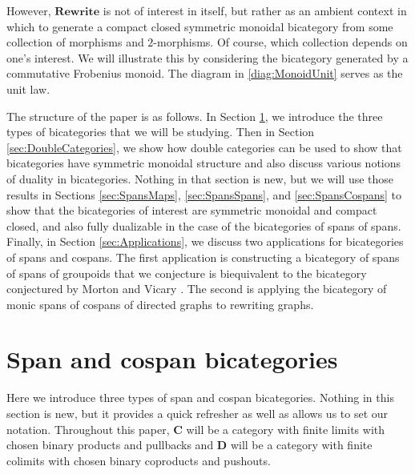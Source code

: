 \documentclass[11pt]{amsart}
\newcommand{\cat}[1]{\mathbf{#1}}
\theoremstyle{remark}
\theoremstyle{definition}
\begin{document}
However, $\cat{Rewrite}$ is not of interest in itself, but rather as an ambient context in which to generate a compact closed symmetric monoidal bicategory from some collection of morphisms and $2$-morphisms. Of course, which collection depends on one's interest.  We will illustrate this by considering the bicategory generated by a commutative Frobenius monoid. The diagram in \eqref{diag:MonoidUnit} serves as the unit law.  
 
The structure of the paper is as follows.  In Section \ref{sec:Span cospan bicats}, we introduce the three types of bicategories that we will be studying.  Then in Section \ref{sec:DoubleCategories}, we show how double categories can be used to show that bicategories have symmetric monoidal structure and also discuss various notions of duality in bicategories.  Nothing in that section is new, but we will use those results in Sections \ref{sec:SpansMaps}, \ref{sec:SpansSpans}, and \ref{sec:SpansCospans} to show that the bicategories of interest are symmetric monoidal and compact closed, and also fully dualizable in the case of the bicategories of spans of spans.  Finally, in Section \ref{sec:Applications}, we discuss two applications for bicategories of spans and cospans.  The first application is constructing a bicategory of spans of spans of groupoids that we conjecture is biequivalent to the bicategory conjectured by Morton and Vicary \cite{MortVic}.  The second is applying the bicategory of monic spans of cospans of directed graphs to rewriting graphs.


\section{Span and cospan bicategories} %
\label{sec:Span cospan bicats}

Here we introduce three types of span and cospan bicategories.  Nothing in this section is new, but it provides a quick refresher as well as allows us to set our notation.  Throughout this paper, $\cat{C}$ will be a category with finite limits with chosen binary products and pullbacks and $\cat{D}$ will be a category with finite colimits with chosen binary coproducts and pushouts.  
\end{document}
